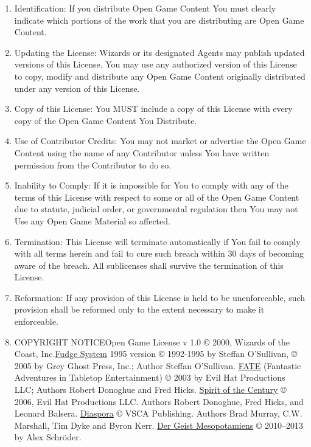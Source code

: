 \documentclass{tufte-handout}
\begin{document}
\begin{fullwidth}
\begin{enumerate}
\item Identification: If you distribute Open Game Content You must
  clearly indicate which portions of the work that you are
  distributing are Open Game Content.

\item Updating the License: Wizards or its designated Agents may
  publish updated versions of this License. You may use any authorized
  version of this License to copy, modify and distribute any Open Game
  Content originally distributed under any version of this License.

\item Copy of this License: You MUST include a copy of this License
  with every copy of the Open Game Content You Distribute.

\item Use of Contributor Credits: You may not market or advertise the
  Open Game Content using the name of any Contributor unless You have
  written permission from the Contributor to do so.

\item Inability to Comply: If it is impossible for You to comply with
  any of the terms of this License with respect to some or all of the
  Open Game Content due to statute, judicial order, or governmental
  regulation then You may not Use any Open Game Material so affected.

\item Termination: This License will terminate automatically if You
  fail to comply with all terms herein and fail to cure such breach
  within 30 days of becoming aware of the breach. All sublicenses
  shall survive the termination of this License.

\item Reformation: If any provision of this License is held to be
  unenforceable, such provision shall be reformed only to the extent
  necessary to make it enforceable.

\item COPYRIGHT NOTICE\newline Open Game License v 1.0 © 2000, Wizards
  of the Coast, Inc.\newline \href{http://www.fudgerpg.com/}{Fudge
    System} 1995 version © 1992-1995 by Steffan O'Sullivan, © 2005 by
  Grey Ghost Press, Inc.; Author Steffan O'Sullivan.\newline
  \href{http://www.faterpg.com/}{\textsf{FATE}} (Fantastic Adventures
  in Tabletop Entertainment) © 2003 by Evil Hat Productions LLC;
  Authors Robert Donoghue and Fred Hicks.\newline
  \href{http://www.crackmonkey.org/\%7Enick/loyhargil/fate3/fate3.html}{Spirit
    of the Century} © 2006, Evil Hat Productions LLC. Authors Robert
  Donoghue, Fred Hicks, and Leonard Balsera.\newline
  \href{http://www.vsca.ca/Diaspora/diaspora-srd.html}{Diaspora} ©
  VSCA Publishing. Authors Brad Murray, C.W. Marshall, Tim Dyke and
  Byron Kerr.\newline
  \href{http://campaignwiki.org/wiki/MontagInZürich/Der_Geist_Mesopotamiens}{Der
    Geist Mesopotamiens} © 2010--2013 by Alex Schröder.


\end{enumerate}
\end{fullwidth}
\end{document}
